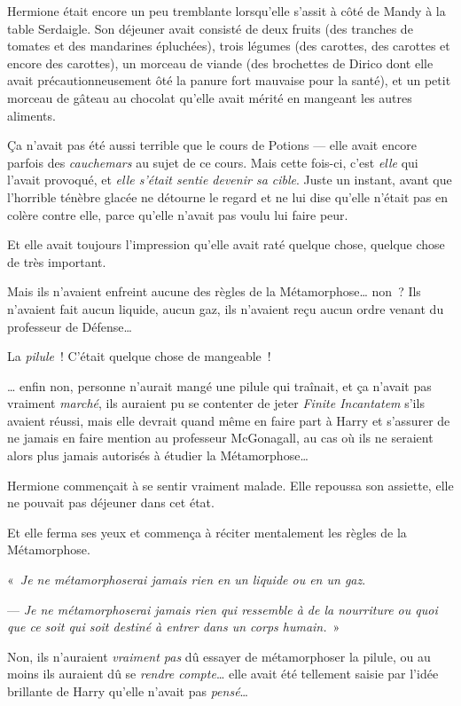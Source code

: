 \later

Hermione était encore un peu tremblante lorsqu'elle s'assit à côté de Mandy à la table Serdaigle.
Son déjeuner avait consisté de deux fruits (des tranches de tomates et des mandarines épluchées), trois légumes (des carottes, des carottes et encore des carottes), un morceau de viande (des brochettes de Dirico dont elle avait précautionneusement ôté la panure fort mauvaise pour la santé), et un petit morceau de gâteau au chocolat qu'elle avait mérité en mangeant les autres aliments.

Ça n'avait pas été aussi terrible que le cours de Potions --- elle avait encore parfois des \emph{cauchemars} au sujet de ce cours.
Mais cette fois-ci, c'est \emph{elle} qui l'avait provoqué, et \emph{elle s'était sentie devenir sa cible}.
Juste un instant, avant que l'horrible ténèbre glacée ne détourne le regard et ne lui dise qu'elle n'était pas en colère contre elle, parce qu'elle n'avait pas voulu lui faire peur.

Et elle avait toujours l'impression qu'elle avait raté quelque chose, quelque chose de très important.

Mais ils n'avaient enfreint aucune des règles de la Métamorphose… non~?
Ils n'avaient fait aucun liquide, aucun gaz, ils n'avaient reçu aucun ordre venant du professeur de Défense…

La \emph{pilule}~!
C'était quelque chose de mangeable~!

… enfin non, personne n'aurait mangé une pilule qui traînait, et ça n'avait pas vraiment \emph{marché}, ils auraient pu se contenter de jeter \emph{Finite Incantatem} s'ils avaient réussi, mais elle devrait quand même en faire part à Harry et s'assurer de ne jamais en faire mention au professeur McGonagall, au cas où ils ne seraient alors plus jamais autorisés à étudier la Métamorphose…

Hermione commençait à se sentir vraiment malade.
Elle repoussa son assiette, elle ne pouvait pas déjeuner dans cet état.

Et elle ferma ses yeux et commença à réciter mentalement les règles de la Métamorphose.

«~\emph{Je ne métamorphoserai jamais rien en un liquide ou en un gaz}.

--- \emph{Je ne métamorphoserai jamais rien qui ressemble à de la nourriture ou quoi que ce soit qui soit destiné à entrer dans un corps humain.}~»

Non, ils n'auraient \emph{vraiment pas} dû essayer de métamorphoser la pilule, ou au moins ils auraient dû se \emph{rendre compte}… elle avait été tellement saisie par l'idée brillante de Harry qu'elle n'avait pas \emph{pensé}…

